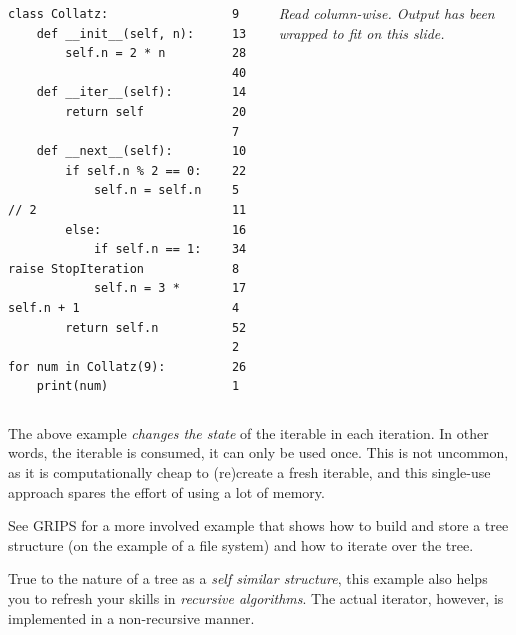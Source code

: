 
\begin{frame}[fragile]
%
\begin{columns}[T]
\begin{codebox}
\begin{verbatim}
class Collatz:
    def __init__(self, n):
        self.n = 2 * n

    def __iter__(self):
        return self

    def __next__(self):
        if self.n % 2 == 0:
            self.n = self.n // 2
        else:
            if self.n == 1: raise StopIteration
            self.n = 3 * self.n + 1
        return self.n

for num in Collatz(9):
    print(num)
\end{verbatim}
\end{codebox}
%
\begin{cmdbox}[Output]
\begin{verbatim}
9   13
28  40
14  20
7   10
22  5
11  16
34  8
17  4
52  2
26  1
\end{verbatim}
\end{cmdbox}
%
\footnotesize
\emph{Read column-wise. Output has been wrapped to fit on this slide.}
\end{columns}
%
\end{frame}


\begin{frame}
%
\begin{hintbox}
The above example \emph{changes the state} of the iterable in each iteration. In other words, the iterable is consumed, it can only be used once. This is not uncommon, as it is computationally cheap to (re)create a fresh iterable, and this single-use approach spares the effort of using a lot of memory.
\end{hintbox}
%
\begin{hintbox}
See GRIPS for a more involved example that shows how to build and store a tree structure (on the example of a file system) and how to iterate over the tree.

\vspace{6pt}
True to the nature of a tree as a \emph{self similar structure}, this example also helps you to refresh your skills in \emph{recursive algorithms}.
The actual iterator, however, is implemented in a non-recursive manner.
\end{hintbox}
%
\end{frame}

